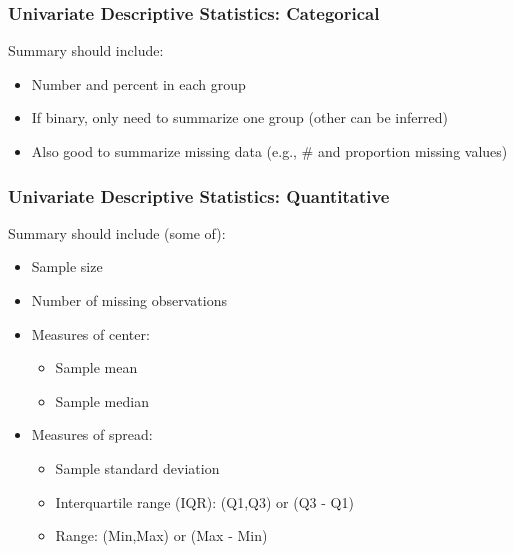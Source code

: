 \documentclass[12pt, 
hyperref={colorlinks=true, linkcolor=blue, urlcolor=cyan}]{beamer}
\begin{document}
\begin{frame}
\frametitle{Univariate Descriptive Statistics: Categorical}

Summary should include:
\begin{itemize}
\item Number and percent in each group
\item If binary, only need to summarize one group (other can be inferred)
\item Also good to summarize missing data (e.g., \#  and proportion missing values)
\end{itemize}

\end{frame}

\begin{frame}
\frametitle{Univariate Descriptive Statistics: Quantitative}

Summary should include (some of):
\begin{itemize}
\item Sample size
\item Number of missing observations
\item Measures of center: 
	\begin{itemize}
	\item Sample mean
	\item Sample median
	\end{itemize}
\item Measures of spread:
	\begin{itemize}
	\item Sample standard deviation
	\item Interquartile range (IQR): (Q1,Q3) or (Q3 - Q1)
	\item Range: (Min,Max) or (Max - Min)
	\end{itemize}
\end{itemize}
\end{frame}
\end{document}

